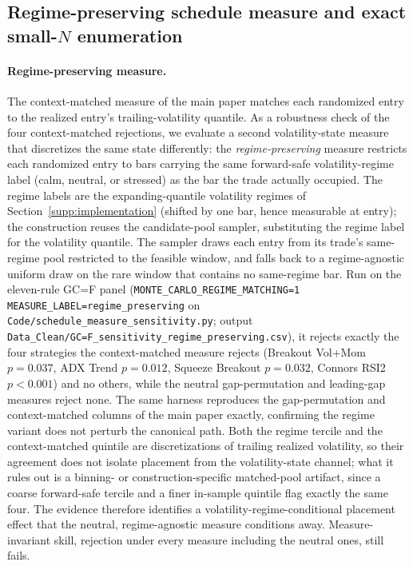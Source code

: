 \documentclass[preprint,12pt]{elsarticle}
\theoremstyle{definition}
\begin{document}
\subsection{Regime-preserving schedule measure and exact small-$N$ enumeration}

\paragraph{Regime-preserving measure.} The context-matched measure of the main paper
matches each randomized entry to the realized entry's trailing-volatility quantile. As
a robustness check of the four context-matched rejections, we evaluate a second
volatility-state measure that discretizes the same state differently: the
\emph{regime-preserving} measure restricts each randomized entry to bars carrying the
same forward-safe volatility-regime label (calm, neutral, or stressed) as the bar the trade
actually occupied. The regime labels are the expanding-quantile volatility regimes of
Section~\ref{supp:implementation} (shifted by one bar, hence measurable at
entry); the construction reuses the candidate-pool sampler, substituting the regime
label for the volatility quantile. The sampler draws each entry from its trade's
same-regime pool restricted to the feasible window, and falls back to a regime-agnostic
uniform draw on the rare window that contains no same-regime bar. Run on the eleven-rule GC=F panel
(\texttt{MONTE\_CARLO\_REGIME\_MATCHING=1 MEASURE\_LABEL=regime\_preserving} on
\texttt{Code/schedule\_measure\_sensitivity.py}; output
\texttt{Data\_Clean/GC=F\_sensitivity\_regime\_preserving.csv}), it rejects exactly the
four strategies the context-matched measure rejects (Breakout Vol+Mom $p=0.037$, ADX
Trend $p=0.012$, Squeeze Breakout $p=0.032$, Connors RSI2 $p<0.001$) and no others,
while the neutral gap-permutation and leading-gap measures reject none. The same harness
reproduces the gap-permutation and context-matched columns of the main paper exactly,
confirming the regime variant does not perturb the canonical path. Both the regime tercile and the context-matched quintile are discretizations of
trailing realized volatility, so their agreement does not isolate placement from the
volatility-state channel; what it rules out is a binning- or construction-specific
matched-pool artifact, since a coarse forward-safe tercile and a finer in-sample quintile
flag exactly the same four. The evidence therefore identifies a volatility-regime-conditional
placement effect that the neutral, regime-agnostic measure conditions away. Measure-invariant
skill, rejection under every measure including the neutral ones, still fails.
\end{document}
